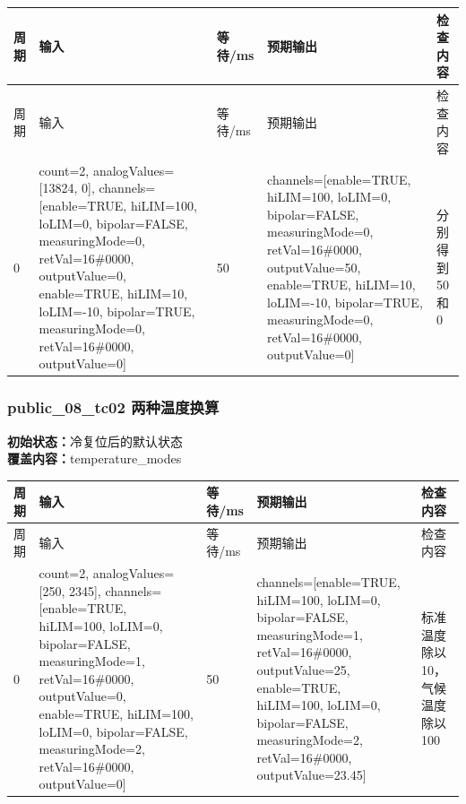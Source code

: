 \begin{longtable}{L{1.0cm}L{4.7cm}L{1.4cm}L{4.0cm}L{2.1cm}}

\toprule

周期 & 输入 & 等待/ms & 预期输出 & 检查内容\\

\midrule

\endfirsthead

\toprule

周期 & 输入 & 等待/ms & 预期输出 & 检查内容\\

\midrule

\endhead

0 & count=2, analogValues=[13824, 0], channels=[enable=TRUE, hiLIM=100, loLIM=0, bipolar=FALSE, measuringMode=0, retVal=16\#0000, outputValue=0, enable=TRUE, hiLIM=10, loLIM=-10, bipolar=TRUE, measuringMode=0, retVal=16\#0000, outputValue=0] & 50 & channels=[enable=TRUE, hiLIM=100, loLIM=0, bipolar=FALSE, measuringMode=0, retVal=16\#0000, outputValue=50, enable=TRUE, hiLIM=10, loLIM=-10, bipolar=TRUE, measuringMode=0, retVal=16\#0000, outputValue=0] & 分别得到 50 和 0\\

\bottomrule

\end{longtable}

\subsubsection{{\ttfamily public\_08\_tc02} 两种温度换算}

\noindent\textbf{初始状态：}冷复位后的默认状态\\

\textbf{覆盖内容：}temperature\_modes

\begin{longtable}{L{1.0cm}L{4.7cm}L{1.4cm}L{4.0cm}L{2.1cm}}

\toprule

周期 & 输入 & 等待/ms & 预期输出 & 检查内容\\

\midrule

\endfirsthead

\toprule

周期 & 输入 & 等待/ms & 预期输出 & 检查内容\\

\midrule

\endhead

0 & count=2, analogValues=[250, 2345], channels=[enable=TRUE, hiLIM=100, loLIM=0, bipolar=FALSE, measuringMode=1, retVal=16\#0000, outputValue=0, enable=TRUE, hiLIM=100, loLIM=0, bipolar=FALSE, measuringMode=2, retVal=16\#0000, outputValue=0] & 50 & channels=[enable=TRUE, hiLIM=100, loLIM=0, bipolar=FALSE, measuringMode=1, retVal=16\#0000, outputValue=25, enable=TRUE, hiLIM=100, loLIM=0, bipolar=FALSE, measuringMode=2, retVal=16\#0000, outputValue=23.45] & 标准温度除以 10，气候温度除以 100\\

\bottomrule

\end{longtable}

